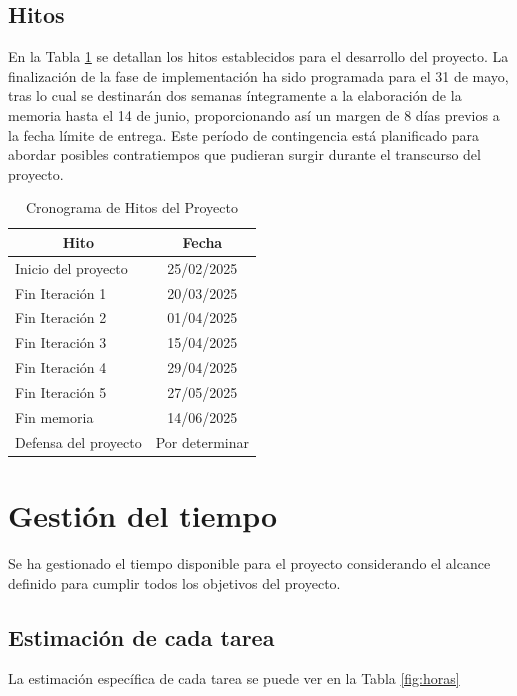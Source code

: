 \subsection{Hitos}\label{sec:hitos}

En la Tabla \ref{tab:hitos} se detallan los hitos establecidos para el desarrollo del proyecto. La finalización de la fase de implementación ha sido programada para el 31 de mayo, tras lo cual se destinarán dos semanas íntegramente a la elaboración de la memoria hasta el 14 de junio, proporcionando así un margen de 8 días previos a la fecha límite de entrega. Este período de contingencia está planificado para abordar posibles contratiempos que pudieran surgir durante el transcurso del proyecto.


\begin{table}[hbtp]\centering
\begin{tabular}{|l|c|}
\hline
\multicolumn{1}{|c|}{\textbf{Hito}} & \multicolumn{1}{c|}{\textbf{Fecha}} \\
\hline
Inicio del proyecto & 25/02/2025 \\
\hline
Fin Iteración 1 & 20/03/2025 \\
\hline
Fin Iteración 2 & 01/04/2025 \\
\hline
Fin Iteración 3 & 15/04/2025 \\
\hline
Fin Iteración 4 & 29/04/2025 \\
\hline
Fin Iteración 5 & 27/05/2025 \\
\hline
Fin memoria & 14/06/2025 \\
\hline
Defensa del proyecto & Por determinar \\
\hline
\end{tabular}
\caption{Cronograma de Hitos del Proyecto}
\label{tab:hitos}
\end{table}

\section{Gestión del tiempo}
Se ha gestionado el tiempo disponible para el proyecto considerando el alcance definido para cumplir todos los objetivos del proyecto. 

\subsection{Estimación de cada tarea}
La estimación específica de cada tarea se puede ver en la Tabla \ref{fig:horas}

